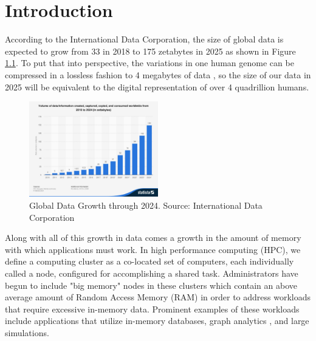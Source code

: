 \chapter{Introduction} \label{introduction}
According to the International Data Corporation, the size of global data is expected to grow from 33 in 2018 to 175 zetabytes in 2025 as shown in Figure \ref{fig:data_growth}. \cite{IDS} To put that into perspective, the variations in one human genome can be compressed in a lossless fashion to 4 megabytes of data \cite{genome_size}, so the size of our data in 2025 will be equivalent to the digital representation of over 4 quadrillion humans. 

\begin{figure}[h]
\centering
\includegraphics[width=0.5\textwidth]{Figures/global_data_growth.jpg}
\caption{Global Data Growth through 2024. Source: International Data Corporation}
\label{fig:data_growth}
\end{figure}

Along with all of this growth in data comes a growth in the amount of memory with which applications must work. In high performance computing (HPC), we define a computing cluster as a co-located set of computers, each individually called a node, configured for accomplishing a shared task.  Administrators have begun to include "big memory" nodes in these clusters which contain an above average amount of Random Access Memory (RAM) in order to address workloads that require excessive in-memory data. Prominent examples of these workloads include applications that utilize in-memory databases, graph analytics \cite{virtual_memory_tlb}, and large simulations. 

